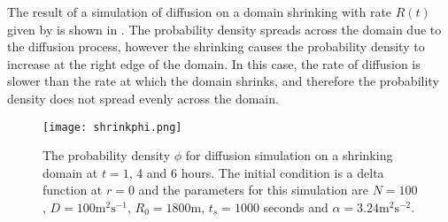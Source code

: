 The result of a simulation of diffusion on a domain shrinking with rate $R(t)$ given by  is shown in . The probability density spreads across the domain due to the diffusion process, however the shrinking causes the probability density to increase at the right edge of the domain. In this case, the rate of diffusion is slower than the rate at which the domain shrinks, and therefore the probability density does not spread evenly across the domain.
    \begin{figure} [h]
        \centering
            \texttt{[image: shrinkphi.png]}
            \caption{The probability density $\phi$ for diffusion simulation on a shrinking domain at $t = 1$, 4 and 6 hours. The initial condition is a delta function at $r = 0$ and the
             parameters for this simulation are $N = 100$, $D = 100\mathrm{m^2s^{-1}}$, $R_0 = 1800$m, $t_s = 1000$ seconds and $\alpha  = 3.24 \mathrm{m^2s^{-2}}$.}
        \label{fig:shrink_phi}
    \end{figure}

